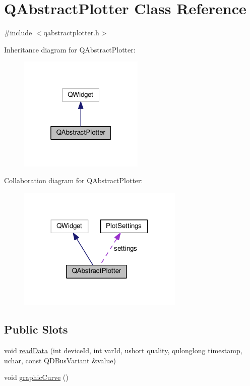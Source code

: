 \hypertarget{class_q_abstract_plotter}{}\section{Q\+Abstract\+Plotter Class Reference}
\label{class_q_abstract_plotter}


{\ttfamily \#include $<$qabstractplotter.\+h$>$}



Inheritance diagram for Q\+Abstract\+Plotter\+:
\nopagebreak
\begin{figure}[H]
\begin{center}
\leavevmode
\includegraphics[width=169pt]{class_q_abstract_plotter__inherit__graph}
\end{center}
\end{figure}


Collaboration diagram for Q\+Abstract\+Plotter\+:
\nopagebreak
\begin{figure}[H]
\begin{center}
\leavevmode
\includegraphics[width=224pt]{class_q_abstract_plotter__coll__graph}
\end{center}
\end{figure}
\subsection*{Public Slots}
\begin{DoxyCompactItemize}
\item 
void \hyperlink{class_q_abstract_plotter_a1260a5f1c229465b57bac324a4e253ae}{read\+Data} (int device\+Id, int var\+Id, ushort quality, qulonglong timestamp, uchar, const Q\+D\+Bus\+Variant \&value)
\item 
void \hyperlink{class_q_abstract_plotter_abf203a97cfe6fd6e8877b46604c18d33}{graphic\+Curve} ()
\end{DoxyCompactItemize}

